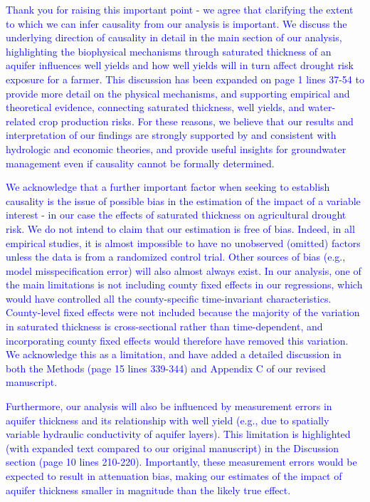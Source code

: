 \documentclass[
]{article}
\begin{document}
\textcolor{blue}{Thank you for raising this important point - we agree that clarifying the extent to which we can infer causality from our analysis is important. We discuss the underlying direction of causality in detail in the main section of our analysis, highlighting the biophysical mechanisms through saturated thickness of an aquifer influences well yields and how well yields will in turn affect drought risk exposure for a farmer. This discussion has been expanded on page 1 lines 37-54 to provide more detail on the physical mechanisms, and supporting empirical and theoretical evidence, connecting saturated thickness, well yields, and water-related crop production risks. For these reasons, we believe that our results and interpretation of our findings are strongly supported by and consistent with hydrologic and economic theories, and provide useful insights for groundwater management even if causality cannot be formally determined.}

\textcolor{blue}{We acknowledge that a further important factor when seeking to establish causality is the issue of possible bias in the estimation of the impact of a variable interest - in our case the effects of saturated thickness on agricultural drought risk. We do not intend to claim that our estimation is free of bias. Indeed, in all empirical studies, it is almost impossible to have no unobserved (omitted) factors unless the data is from a randomized control trial. Other sources of bias (e.g., model misspecification error) will also almost always exist. In our analysis, one of the main limitations is not including county fixed effects in our regressions, which would have controlled all the county-specific time-invariant characteristics. County-level fixed effects were not included because the majority of the variation in saturated thickness is cross-sectional rather than time-dependent, and incorporating county fixed effects would therefore have removed this variation. We acknowledge this as a limitation, and have added a detailed discussion in both the Methods (page 15 lines 339-344) and Appendix C of our revised manuscript.}

\textcolor{blue}{Furthermore, our analysis will also be influenced by measurement errors in aquifer thickness and its relationship with  well yield (e.g., due to spatially variable hydraulic conductivity of aquifer layers). This limitation is highlighted (with expanded text compared to our original manuscript) in the Discussion section (page 10 lines 210-220). Importantly, these measurement errors would be expected to result in attenuation bias, making our estimates of the impact of aquifer thickness smaller in magnitude than the likely true effect.}
\end{document}
